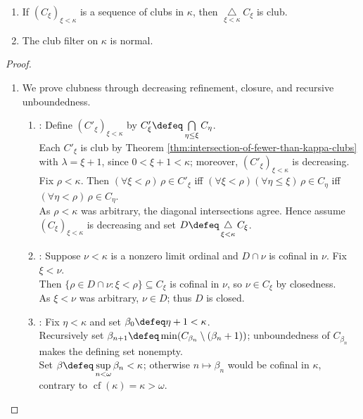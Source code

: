 \begin{theorem} \label{thm:club-filter-is-normal} 
\begin{enumerate}[label=(\roman*)]
\setlength{\itemsep}{0pt}
\item If $(C_\xi)_{\xi<\kappa}$ is a sequence of clubs in $\kappa$, then $\mathop{\triangle}\limits_{\xi<\kappa}C_\xi$ is club.
\item The club filter on $\kappa$ is normal.
\end{enumerate}
\begin{proof}
\begin{enumerate}[label=(\roman*)]
\setlength{\itemsep}{0pt}
\item We prove clubness through decreasing refinement, closure, and recursive unboundedness.
\begin{enumerate}[label=(\alph*)]
\setlength{\itemsep}{0pt}
\item {}: Define $(C'_\xi)_{\xi<\kappa}$ by $C'_\xi\defeq\bigcap\limits_{\eta\leq\xi}C_\eta$.\\
Each $C'_\xi$ is club by Theorem \ref{thm:intersection-of-fewer-than-kappa-clubs} with $\lambda=\xi+1$, since $0<\xi+1<\kappa$; moreover, $(C'_\xi)_{\xi<\kappa}$ is decreasing.\\
Fix $\rho<\kappa$. Then $(\forall\xi<\rho)\,\rho\in C'_\xi$ iff $(\forall\xi<\rho)(\forall\eta\leq\xi)\,\rho\in C_\eta$ iff $(\forall\eta<\rho)\,\rho\in C_\eta$.\\
As $\rho<\kappa$ was arbitrary, the diagonal intersections agree. Hence assume $(C_\xi)_{\xi<\kappa}$ is decreasing and set $D\defeq\mathop{\triangle}\limits_{\xi<\kappa}C_\xi$.
\item {}: Suppose $\nu<\kappa$ is a nonzero limit ordinal and $D\cap\nu$ is cofinal in $\nu$. Fix $\xi<\nu$.\\
Then $\{\rho\in D\cap\nu:\xi<\rho\}\subseteq C_\xi$ is cofinal in $\nu$, so $\nu\in C_\xi$ by closedness.\\
As $\xi<\nu$ was arbitrary, $\nu\in D$; thus $D$ is closed.
\item {}: Fix $\eta<\kappa$ and set $\beta_0\defeq\eta+1<\kappa$.\\
Recursively set $\beta_{n+1}\defeq\min(C_{\beta_n}\setminus(\beta_n+1))$; unboundedness of $C_{\beta_n}$ makes the defining set nonempty.\\
Set $\beta\defeq\sup\limits_{n<\omega}\beta_n<\kappa$; otherwise $n\mapsto\beta_n$ would be cofinal in $\kappa$, contrary to $\operatorname{cf}(\kappa)=\kappa>\omega$.\\

\end{enumerate}
\end{enumerate}
\end{proof}
\end{theorem}
